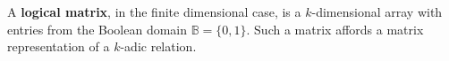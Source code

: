 \documentclass[12pt]{article}
\begin{document}
A \textbf{logical matrix}, in the finite dimensional case, is a $k$-dimensional array with entries from the Boolean domain $\mathbb{B} = \{ 0, 1 \}$.  Such a matrix affords a matrix representation of a $k$-adic relation.

\end{document}
